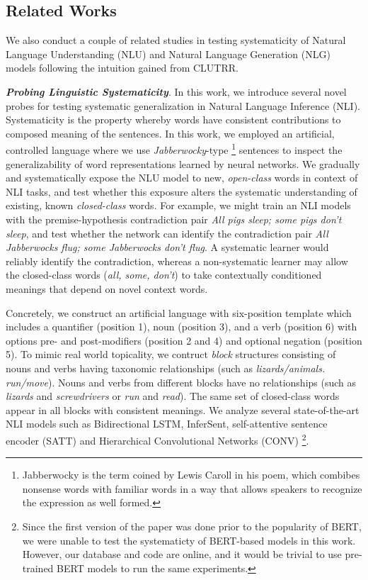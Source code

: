 \documentclass[12pt]{article}
\newcommand{\xhdr}[1]{{\noindent\bfseries #1}.}
\begin{document}
\subsection{Related Works}

We also conduct a couple of related studies in testing systematicity of Natural Language Understanding (NLU) and Natural Language Generation (NLG) models following the intuition gained from CLUTRR.

\xhdr{\textit{Probing Linguistic Systematicity}} \cite{goodwin2020} In this work, we introduce several novel probes for testing systematic generalization in Natural Language Inference (NLI). Systematicity is the property whereby words have consistent contributions to composed meaning of the sentences. In this work, we employed an artificial, controlled language where we use \textit{Jabberwocky}-type \footnote{Jabberwocky is the term coined by Lewis Caroll in his poem, which combibes nonsense words with familiar words in a way that allows speakers to recognize the expression as well formed.} sentences to inspect the generalizability of word representations learned by neural networks. We gradually and systematically expose the NLU model to new, \textit{open-class} words in context of NLI tasks, and test whether this exposure alters the systematic understanding of existing, known \textit{closed-class} words. For example, we might train an NLI models with the premise-hypothesis contradiction pair \textit{All pigs sleep; some pigs don't sleep}, and test whether the network can identify the contradiction pair \textit{All Jabberwocks flug; some Jabberwocks don't flug}. A systematic learner would reliably identify the contradiction, whereas a non-systematic learner may allow the closed-class words (\textit{all, some, don't}) to take contextually conditioned meanings that depend on novel context words.

Concretely, we construct an artificial language with six-position template which includes a quantifier (position 1), noun (position 3), and a verb (position 6) with options pre- and post-modifiers (position 2 and 4) and optional negation (position 5). To mimic real world topicality, we contruct \textit{block} structures consisting of nouns and verbs having taxonomic relationships (such as \textit{lizards/animals. run/move}). Nouns and verbs from different blocks have no relationships (such as \textit{lizards} and \textit{screwdrivers} or \textit{run} and \textit{read}). The same set of closed-class words appear in all blocks with consistent meanings. We analyze several state-of-the-art NLI models such as Bidirectional LSTM, InferSent, self-attentive sentence encoder (SATT) and Hierarchical Convolutional Networks (CONV) \footnote{Since the first version of the paper was done prior to the popularity of BERT, we were unable to test the systematicty of BERT-based models in this work. However, our database and code are online, and it would be trivial to use pre-trained BERT models to run the same experiments.}.
\end{document}
